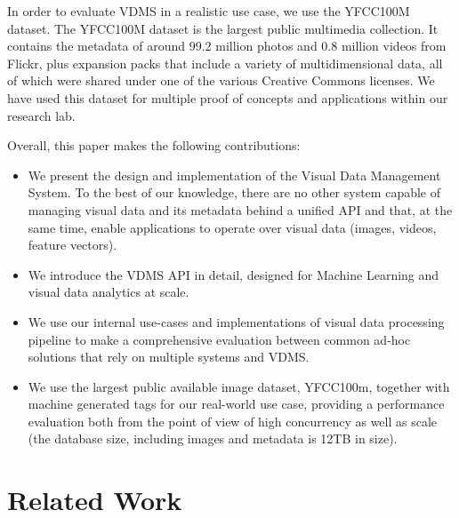 In order to evaluate VDMS in a realistic use case,
we use the YFCC100M dataset\cite{Thomee_2016}.
The YFCC100M dataset is the largest public multimedia collection.
It contains the metadata of around 99.2 million photos
and 0.8 million videos from Flickr,
plus expansion packs \cite{features} that include a variety of multidimensional
data, all of which were shared under one of the various Creative Commons licenses.
We have used this dataset for multiple proof of concepts and
applications within our research lab.

Overall, this paper makes the following contributions:

\begin{itemize}
\item We present the design and implementation of the Visual Data Management System.
To the best of our knowledge, there are no other system capable of
managing visual data and its metadata behind a unified API
and that, at the same time, enable applications to operate over visual data
(images, videos, feature vectors).

\item We introduce the VDMS API in detail, designed for Machine Learning and visual
data analytics at scale.

\item We use our internal use-cases and implementations of visual data processing
pipeline to make a comprehensive evaluation between common ad-hoc solutions
that rely on multiple systems and VDMS.

\item We use the largest public available image dataset, YFCC100m, together
with machine generated tags for our real-world use case, providing a performance
evaluation both from the point of view of high concurrency as well as
scale (the database size, including images and metadata is 12TB in size).
\end{itemize}

\section{Related Work}

